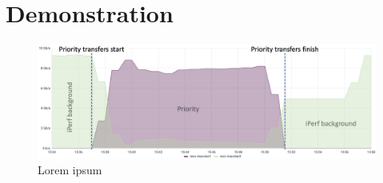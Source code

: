 \section{Demonstration}

\begin{figure}[htb]
  \centering
  \includegraphics[width=.9\textwidth]{fig/cyber/rucio-sense_demo.png}
  \caption{Lorem ipsum}
  \label{fig:rucio_sense_demo}
\end{figure}
